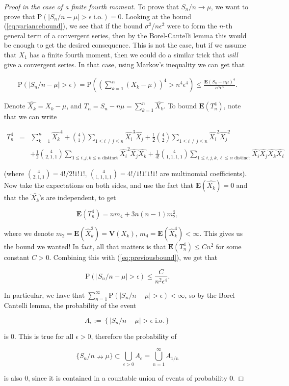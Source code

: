 \documentclass[11pt]{report}
\theoremstyle{plain}
\theoremstyle{definition}
\begin{document}
\begin{proof}[Proof in the case of a finite fourth moment]
To prove that $S_n/n\to \mu$, we want to prove that
$\mathrm{P}(|S_n/n-\mu|>\epsilon\textrm{ i.o.})=0$.
Looking at the bound (\ref{eq:variancebound}), we see that
if the bound $\sigma^2/n\epsilon^2$ were to form the
$n$-th general term of a convergent series, then by
the Borel-Cantelli lemma this would be enough to get
the desired consequence. This is not the case, but if
we assume that $X_1$ has a finite fourth moment, then
we could do a similar trick that \emph{will} give a
convergent series. In that case, using Markov's
inequality we can get that

\begin{align*}
\tag{18}\label{eq:previousbound}
\mathrm{P}(|S_n/n-\mu|>\epsilon) = \mathrm{P}\left(\left( \sum_{k=1}^n (X_k-\mu) \right)^4 > n^4 \epsilon^4\right)
\le \frac{\mathbf{E}(S_n-n\mu)^4}{n^4 \epsilon^4}.
\end{align*}

Denote $\hat{X_k}=X_k-\mu$, and
$T_n = S_n-n\mu= \sum_{k=1}^n \hat{X_k}$. To bound
$\mathbf{E}(T_n^4)$, note that we can write

\begin{eqnarray*}
T_n^4 &=& \sum_{k=1}^n \hat{X_k}^4 + \binom{4}{1} \sum_{1 \le i\neq j \le n} \hat{X_i}^3 \hat{X_j}
+ \frac12\binom{4}{2}\sum_{1 \le i\neq j \le n} \hat{X_i}^2 \hat{X_j}^2 \\
& & + \frac12\binom{4}{2,1,1} \sum_{1\le i,j,k \le n\textrm{ distinct}} \hat{X_i}^2 \hat{X_j} \hat{X_k}
+ \frac{1}{4!}\binom{4}{1,1,1,1} \sum_{1 \le i,j,k,\ell \le n\textrm{ distinct}} \hat{X_i} \hat{X_j} \hat{X_k} \hat{X_\ell}
\end{eqnarray*}

(where $\binom{4}{2,1,1}=4!/2!1!1!$,
$\binom{4}{1,1,1,1}=4!/1!1!1!1!$ are multinomial
coefficients). Now take the expectations on both
sides, and use the fact that
$\mathbf{E}(\hat{X_k}) = 0$ and that the $\hat{X_k}$'s
are independent, to get

\[
\mathbf{E}(T_n^4) = n m_4 + 3n(n-1) m_2^2,
\]

where we denote
$m_2 = \mathbf{E}(\hat{X}_k^2) = \mathbf{V}(X_k)$,
$m_4=\mathbf{E}(\hat{X}_k^4)<\infty$. This gives us
the bound we wanted! In fact, all that matters is that
$\mathbf{E}(T_n^4)\le C n^2$ for some constant $C>0$.
Combining this with (\ref{eq:previousbound}), we get that

\[
\mathrm{P}(|S_n/n-\mu|>\epsilon) \le \frac{C}{n^2 \epsilon^4}.
\]

In particular, we have that
$\sum_{n=1}^\infty \mathrm{P}(|S_n/n-\mu|>\epsilon)
<\infty$,
so by the Borel-Cantelli lemma, the probability of the
event

\[
A_\epsilon := \left\{|S_n/n-\mu|>\epsilon \textrm{ i.o.}\right\}
\]

is $0$. This is true for all $\epsilon>0$, therefore
the probability of

\[
\{S_n/n\nrightarrow \mu\} \subset \bigcup_{\epsilon>0} A_\epsilon = \bigcup_{n=1}^\infty A_{1/n}
\]

is also $0$, since it is contained in a countable
union of events of probability 0.
\end{proof}
\end{document}
